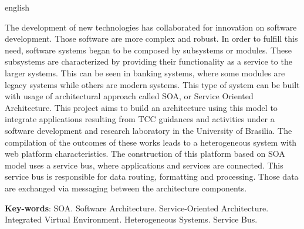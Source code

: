 \begin{resumo}[Abstract]
 \begin{otherlanguage*}{english}

The development of new technologies has collaborated for innovation on software development. Those software are more complex and robust. In order to fulfill this need, software systems began to be composed by subsystems or modules. These subsystems are characterized by providing their functionality as a service to the larger systems. This can be seen in banking systems, where some modules are legacy systems while others are modern systems. This type of system can be built with usage of architectural approach called SOA, or Service Oriented Architecture. This project aims to build an architecture using this model to integrate applications resulting from TCC guidances and activities under a software development and research laboratory in the University of Brasilia. The compilation of the outcomes of these works leads to a heterogeneous system with web platform characteristics. The construction of this platform based on SOA model uses a service bus, where applications and services are connected. This service bus is responsible for data routing, formatting and processing. Those data are exchanged via messaging between the architecture components.

   \vspace{\onelineskip}
 
   \noindent 
   \textbf{Key-words}: SOA. Software Architecture. Service-Oriented Architecture. Integrated Virtual Environment. Heterogeneous Systems. Service Bus.
 \end{otherlanguage*}
\end{resumo}
